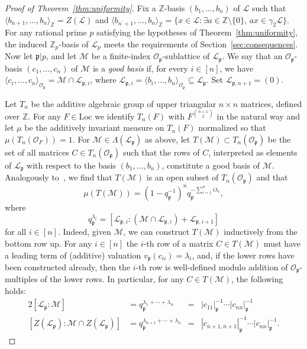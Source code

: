 \documentclass[11pt,a4paper]{amsart}
\theoremstyle{plain}
\theoremstyle{remark}
\newcommand{\Z}{\mathbb{Z}}
\newcommand{\p}{\mathfrak{p}}
\newcommand{\dimL}{n}
\newcommand{\overdim}{\overline{n}}
\def \p {\ensuremath{\mathfrak{p}}}
\begin{document}
\begin{proof}[Proof of Theorem~\ref{thm:uniformity}]
Fix a $\Z$-basis $(b_1, \dots, b_\dimL)$ of $\mathcal{L}$ such that $\langle b_{\overdim + 1}, \dots, b_\dimL \rangle_\Z = Z(\mathcal{L})$ and $\langle b_{\dimL^\prime + 1}, \dots, b_{\dimL} \rangle_\Z = \{ x \in \mathcal{L} : \exists a \in \Z \setminus \{ 0 \}, \, ax \in \gamma_2 \mathcal{L} \}$.  For any rational prime $p$ satisfying the hypotheses of Theorem~\ref{thm:uniformity}, the induced $\Z_p$-basis of $\mathcal{L}_p$ meets the requirements of Section~\ref{sec:consequences}.  Now let $\p | p$, and let $\mathcal{M}$ be a finite-index $\mathcal{O}_\p$-sublattice of $\mathcal{L}_\p$.  We say that an $\mathcal{O}_\p$-basis $(c_1, \dots, c_\dimL)$ of $\mathcal{M}$ is a \emph{good basis} if, for every $i \in [ \dimL ]$, we have $\langle c_i, \dots, c_\dimL \rangle_{\mathcal{O}_\p} = \mathcal{M} \cap \mathcal{L}_{\p, i}$, where $\mathcal{L}_{\p, i} = \langle b_i, \dots, b_\dimL \rangle_{\mathcal{O}_\p} \subseteq \mathcal{L}_\p$.  Set $\mathcal{L}_{\p, \dimL + 1} = (0)$.  

Let $T_\dimL$ be the additive algebraic group of upper triangular $\dimL \times \dimL$ matrices, defined over $\Z$.  For any $F \in \mathrm{Loc}$ we identify $T_\dimL (F)$ with $F^{\binom{n+1}{2}}$ in the natural way and let $\mu$ be the additively invariant measure on $T_\dimL (F)$ normalized so that $\mu(T_\dimL (\mathcal{O}_F)) = 1$.  For $\mathcal{M} \in \Lambda(\mathcal{L}_\p)$ as above, let $T(\mathcal{M}) \subset T_\dimL (\mathcal{O}_\p)$ be the set of all matrices $C \in T_\dimL (\mathcal{O}_\p)$ such that the rows of $C$, interpreted as elements of $\mathcal{L}_\p$ with respect to the basis $(b_1, \dots, b_\dimL)$, constitute a good basis of $\mathcal{M}$.  Analogously to~\cite[Lemma~2.5]{GSS/88}, we find that $T(\mathcal{M})$ is an open subset of $T_\dimL (\mathcal{O}_\p)$ and that 
\begin{equation} \label{equ:measure}
 \mu (T(\mathcal{M})) = (1 - q_\p^{-1})^\dimL q_\p^{- \sum_{i = 1}^\dimL i \lambda_i},
\end{equation}
where
$$ q_\p^{\lambda_i} = [ \mathcal{L}_{\p,i} : (\mathcal{M} \cap \mathcal{L}_{\p,i}) + \mathcal{L}_{\p,i+1}]$$
for all $i \in [ \dimL ]$.  Indeed, given $\mathcal{M}$, we can construct $T(\mathcal{M})$ inductively from the bottom row up.  For any $i \in [ \dimL ]$ the $i$-th row of a matrix $C \in T(\mathcal{M})$ must have a leading term of (additive) valuation $v_\p(c_{ii}) = \lambda_i$, and, if the lower rows have been constructed already, then the $i$-th row is well-defined modulo addition of $\mathcal{O}_\p$-multiples of the lower rows.  In particular, for any $C \in T(\mathcal{M})$, the following holds:
\begin{alignat}{2} \label{equ:integral.rewrite}
[\mathcal{L}_\p : \mathcal{M}] & =  q_{\p}^{\lambda_1 + \cdots + \lambda_\dimL} & = & |c_{11} |_{\p}^{-1} \cdots | c_{\dimL \dimL} |_{\p}^{-1} \\ \nonumber
[Z(\mathcal{L}_\p) : \mathcal{M} \cap Z(\mathcal{L}_\p)] & =  q_{\p}^{\lambda_{\overline{\dimL} + 1} + \cdots + \lambda_\dimL} & = & |c_{\overline{\dimL} + 1, \overline{\dimL} + 1} |_{\p}^{-1} \cdots | c_{\dimL \dimL} |_{\p}^{-1}.
\end{alignat}


\end{proof}
\end{document}
